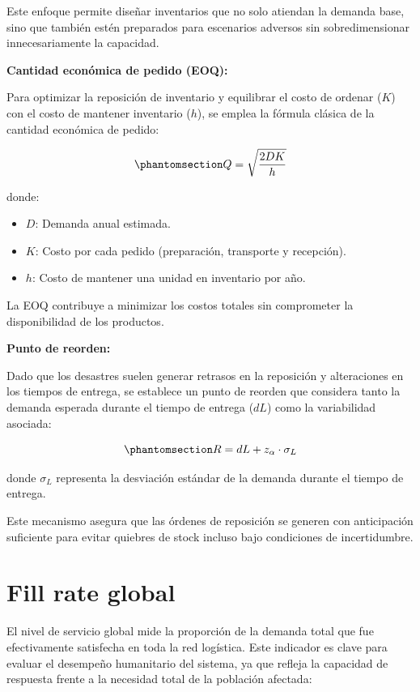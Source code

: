 \documentclass[
  spanish,
  us-letterpaper,
  DIV=11,
  numbers=noendperiod]{scrreprt}
\providecommand{\tightlist}{%
  \setlength{\itemsep}{0pt}\setlength{\parskip}{0pt}}
\numberwithin{equation}{section}
\begin{document}
Este enfoque permite diseñar inventarios que no solo atiendan la demanda
base, sino que también estén preparados para escenarios adversos sin
sobredimensionar innecesariamente la capacidad.

\textbf{Cantidad económica de pedido (EOQ):}

Para optimizar la reposición de inventario y equilibrar el costo de
ordenar (\(K\)) con el costo de mantener inventario (\(h\)), se emplea
la fórmula clásica de la cantidad económica de pedido:

\begin{equation}\phantomsection\label{eq-EOQ}{
Q = \sqrt{\frac{2DK}{h}} 
}\end{equation}

donde:

\begin{itemize}
\tightlist
\item
  \(D\): Demanda anual estimada.
\item
  \(K\): Costo por cada pedido (preparación, transporte y recepción).
\item
  \(h\): Costo de mantener una unidad en inventario por año.
\end{itemize}

La EOQ contribuye a minimizar los costos totales sin comprometer la
disponibilidad de los productos.

\textbf{Punto de reorden:}

Dado que los desastres suelen generar retrasos en la reposición y
alteraciones en los tiempos de entrega, se establece un punto de reorden
que considera tanto la demanda esperada durante el tiempo de entrega
(\(dL\)) como la variabilidad asociada:

\begin{equation}\phantomsection\label{eq-pr}{
R = dL + z_{\alpha} \cdot \sigma_L 
}\end{equation}

donde \(\sigma_L\) representa la desviación estándar de la demanda
durante el tiempo de entrega.

Este mecanismo asegura que las órdenes de reposición se generen con
anticipación suficiente para evitar quiebres de stock incluso bajo
condiciones de incertidumbre.

\section{Fill rate global}\label{fill-rate-global}

El nivel de servicio global mide la proporción de la demanda total que
fue efectivamente satisfecha en toda la red logística. Este indicador es
clave para evaluar el desempeño humanitario del sistema, ya que refleja
la capacidad de respuesta frente a la necesidad total de la población
afectada:
\end{document}
